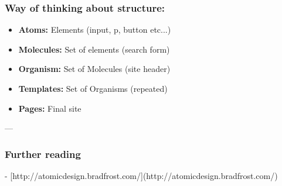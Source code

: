 \subsubsection{Way of thinking about structure:}

\begin{itemize}
    \item \textbf{Atoms:} Elements (input, p, button etc...)
    \item \textbf{Molecules:} Set of elements (search form)
    \item \textbf{Organism:} Set of Molecules (site header)
    \item \textbf{Templates:} Set of Organisms (repeated)
    \item \textbf{Pages:} Final site
\end{itemize}


---

\subsubsection{Further reading}

- [http://atomicdesign.bradfrost.com/](http://atomicdesign.bradfrost.com/)

